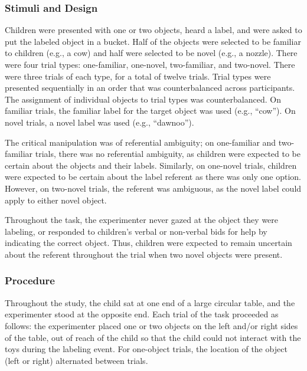 \documentclass[10pt, letterpaper]{article}
\begin{document}
\subsubsection{Stimuli and Design}\label{stimuli-and-design}

Children were presented with one or two objects, heard a label, and were
asked to put the labeled object in a bucket. Half of the objects were
selected to be familiar to children (e.g., a cow) and half were selected
to be novel (e.g., a nozzle). There were four trial types: one-familiar,
one-novel, two-familiar, and two-novel. There were three trials of each
type, for a total of twelve trials. Trial types were presented
sequentially in an order that was counterbalanced across participants.
The assignment of individual objects to trial types was counterbalanced.
On familiar trials, the familiar label for the target object was used
(e.g., ``cow''). On novel trials, a novel label was used (e.g.,
``dawnoo'').

The critical manipulation was of referential ambiguity; on one-familiar
and two-familiar trials, there was no referential ambiguity, as children
were expected to be certain about the objects and their labels.
Similarly, on one-novel trials, children were expected to be certain
about the label referent as there was only one option. However, on
two-novel trials, the referent was ambiguous, as the novel label could
apply to either novel object.

Throughout the task, the experimenter never gazed at the object they
were labeling, or responded to children's verbal or non-verbal bids for
help by indicating the correct object. Thus, children were expected to
remain uncertain about the referent throughout the trial when two novel
objects were present.

\subsubsection{Procedure}\label{procedure}

Throughout the study, the child sat at one end of a large circular
table, and the experimenter stood at the opposite end. Each trial of the
task proceeded as follows: the experimenter placed one or two objects on
the left and/or right sides of the table, out of reach of the child so
that the child could not interact with the toys during the labeling
event. For one-object trials, the location of the object (left or right)
alternated between trials.
\end{document}

